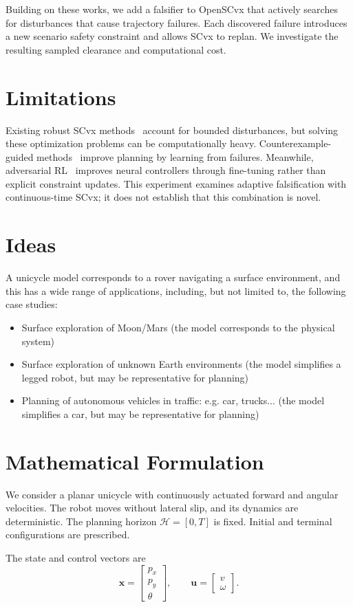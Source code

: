 \documentclass{article}
\begin{document}
Building on these works, we add a falsifier to OpenSCvx that actively searches
for disturbances that cause trajectory failures. Each discovered failure introduces a new scenario safety constraint and allows SCvx to replan. We investigate the resulting sampled clearance and computational cost.



\section{Limitations}
Existing robust SCvx methods~\cite{abdul2025,wang2026} account for bounded disturbances, but solving these optimization problems can be computationally heavy. Counterexample-guided methods~\cite{dawson2022} improve planning by learning from failures. Meanwhile, adversarial RL~\cite{shi2024} improves neural controllers through fine-tuning rather than explicit constraint updates. This experiment examines adaptive falsification with continuous-time SCvx; it does not establish that this combination is novel.
\section{Ideas}
A unicycle model corresponds to a rover navigating a surface environment, and this has a wide range of applications, including, but not limited to, the following case studies: 
\begin{itemize}
\item Surface exploration of Moon/Mars (the model corresponds to the physical system)
\item Surface exploration of unknown Earth environments (the model simplifies a legged robot, but may be representative for planning)
\item Planning of autonomous vehicles in traffic: e.g. car, trucks... (the model simplifies a car, but may be representative for planning)
\end{itemize}
\section{Mathematical Formulation}

We consider a planar unicycle with continuously actuated
forward and angular velocities. The robot moves without
lateral slip, and its dynamics are deterministic.
The planning horizon $\mathcal H=[0,T]$ is fixed.
Initial and terminal configurations are prescribed.

The state and control vectors are
\begin{equation}
\bm{x} =
\begin{bmatrix}p_x\\p_y\\\theta\end{bmatrix},
\qquad
\bm{u} =
\begin{bmatrix}v\\\omega\end{bmatrix}.
\end{equation}
\end{document}
